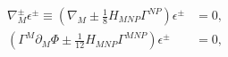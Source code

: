 \begin{equation}
\label{susy}
\begin{aligned}
   \nabla^\pm_M \epsilon^\pm \equiv \left( \nabla_M \pm 
         \tfrac{1}{8}H_{MNP}\Gamma^{NP} \right)\epsilon^\pm 
      &= 0 , \\
   \left(\Gamma^M\partial_M\Phi \pm 
         \tfrac{1}{12}H_{MNP} \Gamma^{MNP}
         \right) \epsilon^\pm 
      &= 0 ,
\end{aligned}
\end{equation}


